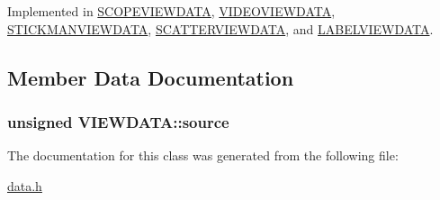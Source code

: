 Implemented in \hyperlink{class_s_c_o_p_e_v_i_e_w_d_a_t_a_8d8d73b107c571f756cd97d87809925d}{SCOPEVIEWDATA}, \hyperlink{class_v_i_d_e_o_v_i_e_w_d_a_t_a_ce8442db2dd761b868584957cc49bfd2}{VIDEOVIEWDATA}, \hyperlink{class_s_t_i_c_k_m_a_n_v_i_e_w_d_a_t_a_609a042318ede3d5379050bfe6945c65}{STICKMANVIEWDATA}, \hyperlink{class_s_c_a_t_t_e_r_v_i_e_w_d_a_t_a_afd6be79567be97348e6c98094e00596}{SCATTERVIEWDATA}, and \hyperlink{class_l_a_b_e_l_v_i_e_w_d_a_t_a_63c4ddf89ce52628c8beab252c4c4ba2}{LABELVIEWDATA}.

\subsection{Member Data Documentation}
\hypertarget{class_v_i_e_w_d_a_t_a_ebcb455317fac9dd8048cc480aa41884}{
\subsubsection[{source}]{\setlength{\rightskip}{0pt plus 5cm}unsigned {\bf VIEWDATA::source}}}
\label{class_v_i_e_w_d_a_t_a_ebcb455317fac9dd8048cc480aa41884}




The documentation for this class was generated from the following file:\begin{CompactItemize}
\item 
\hyperlink{data_8h}{data.h}\end{CompactItemize}
